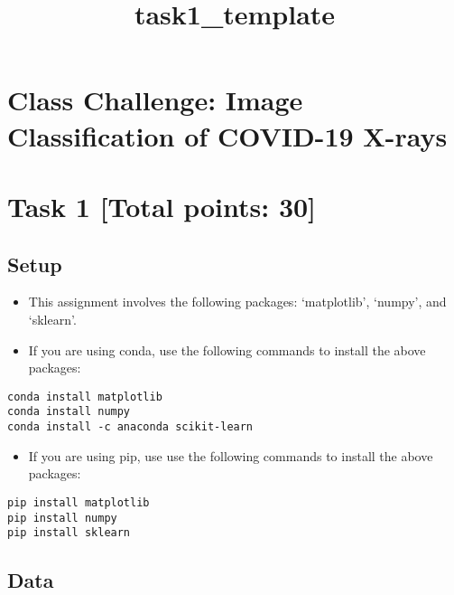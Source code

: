 \documentclass[11pt]{article}
\title{task1\_template}
\providecommand{\tightlist}{%
      \setlength{\itemsep}{0pt}\setlength{\parskip}{0pt}}
\begin{document}
    
    \maketitle
    
    

    
    \hypertarget{class-challenge-image-classification-of-covid-19-x-rays}{%
\section{Class Challenge: Image Classification of COVID-19
X-rays}\label{class-challenge-image-classification-of-covid-19-x-rays}}

\hypertarget{task-1-total-points-30}{%
\section{Task 1 {[}Total points: 30{]}}\label{task-1-total-points-30}}

    \hypertarget{setup}{%
\subsection{Setup}\label{setup}}

\begin{itemize}
\item
  This assignment involves the following packages: `matplotlib',
  `numpy', and `sklearn'.
\item
  If you are using conda, use the following commands to install the
  above packages:
\end{itemize}

\begin{verbatim}
conda install matplotlib
conda install numpy
conda install -c anaconda scikit-learn
\end{verbatim}

\begin{itemize}
\tightlist
\item
  If you are using pip, use use the following commands to install the
  above packages: 
\end{itemize}

\begin{verbatim}
pip install matplotlib
pip install numpy
pip install sklearn
\end{verbatim}

    \hypertarget{data}{%
\subsection{Data}\label{data}}
\end{document}
